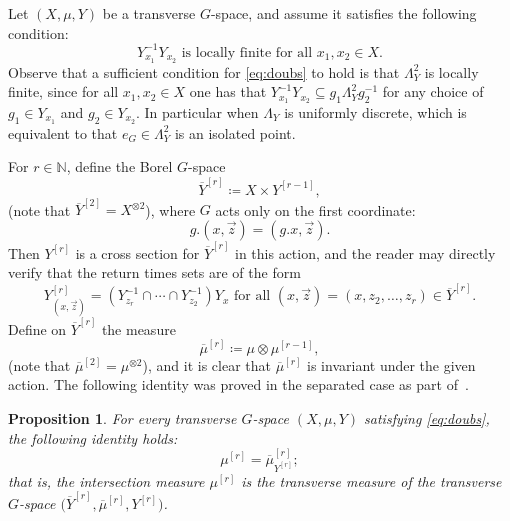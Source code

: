 \documentclass{amsart}
\numberwithin{equation}{subsection}
\newtheorem{prop}[thm]{Proposition}
\theoremstyle{remark}
\begin{document}
Let \(\left(X,\mu,Y\right)\) be a transverse \(G\)-space, and assume it satisfies the following condition:
\begin{equation}\label{eq:doubs}\tag{\(\bigstar\)}
Y_{x_{1}}^{-1}Y_{x_{2}}\text{ is locally finite for all }x_{1},x_{2}\in X.
\end{equation}
Observe that a sufficient condition for \eqref{eq:doubs} to hold is that \(\Lambda_{Y}^{2}\) is locally finite, since for all \(x_{1},x_{2}\in X\) one has that \(Y_{x_{1}}^{-1}Y_{x_{2}}\subseteq g_{1}\Lambda_{Y}^{2}g_{2}^{-1}\)  for any choice of \(g_{1}\in Y_{x_{1}}\) and \(g_{2}\in Y_{x_{2}}\). In particular when \(\Lambda_{Y}\) is uniformly discrete, which is equivalent to that \(e_{G}\in\Lambda_{Y}^{2}\) is an isolated point.

For \(r\in\mathbb{N}\), define the Borel \(G\)-space
\[\overline{Y}^{\left[r\right]}\coloneqq X\times Y^{\left[r-1\right]},\]
(note that \(\overline{Y}^{\left[2\right]}=X^{\otimes 2}\)), where \(G\) acts only on the first coordinate:
\[g.\left(x,\vec{z}\right)=\left(g.x,\vec{z}\right).\]
Then \(Y^{\left[r\right]}\) is a cross section for \(\overline{Y}^{\left[r\right]}\) in this action, and the reader may directly verify that the return times sets are of the form
\[Y_{\left(x,\vec{z}\right)}^{\left[r\right]}=\left(Y_{z_{r}}^{-1}\cap\dotsm\cap Y_{z_{2}}^{-1}\right)Y_{x}\text{ for all }\left(x,\vec{z}\right)=\left(x,z_{2},\dotsc,z_{r}\right)\in\overline{Y}^{\left[r\right]}.\]
Define on \(\overline{Y}^{\left[r\right]}\) the measure
\[\overline{\mu}^{\left[r\right]}\coloneqq\mu\otimes\mu^{\left[r-1\right]},\]
(note that \(\overline{\mu}^{\left[2\right]}=\mu^{\otimes 2}\)), and it is clear that \(\overline{\mu}^{\left[r\right]}\) is invariant under the given action. The following identity was proved in the separated case as part of~\cite[Theorem 7.2]{bjorklund2025int}.

\begin{prop}\label{prop:intmeasiden}
For every transverse \(G\)-space \(\left(X,\mu,Y\right)\) satisfying \eqref{eq:doubs}, the following identity holds:
\[\mu^{\left[r\right]}=\overline{\mu}_{Y^{\left[r\right]}}^{\left[r\right]};\]
that is, the intersection measure \(\mu^{\left[r\right]}\) is the transverse measure of the transverse \(G\)-space \(\big(\overline{Y}^{\left[r\right]},\overline{\mu}^{\left[r\right]},Y^{\left[r\right]}\big)\).
\end{prop}
\end{document}
